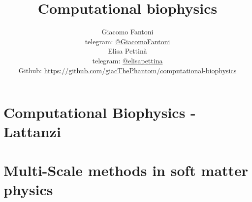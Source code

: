 

\title{\Huge\textbf{{Computational biophysics}}}

\author{
  Giacomo Fantoni \\
  \small telegram: \href{https://t.me/GiacomoFantoni}{@GiacomoFantoni} \\[3pt]
  Elisa Pettin\`a \\
  \small telegram: \href{https://t.me/elisapettina}{@elisapettina} \\[3pt]
  \small Github: \href{https://github.com/giacThePhantom/computational-biophysics}{https://github.com/giacThePhantom/computational-biophysics}\\
}




  \maketitle
  \tableofcontents

  \part{Computational Biophysics - Lattanzi}
  
  
  
  
  
  
  
  
  
  
  
  
  
  
  
  
  
  
  
  

  \part{Multi-Scale methods in soft matter physics}
  


